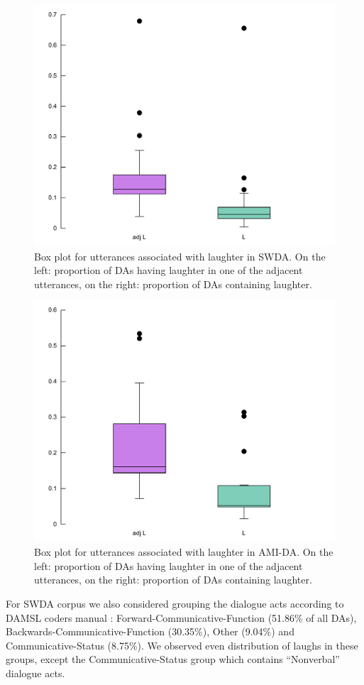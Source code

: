 \documentclass[11pt,a4paper]{article}
\begin{document}
\begin{figure}
  \centering
  \includegraphics[width=0.8\linewidth]{img/box-swda.pdf}
  \caption{Box plot for utterances associated with laughter in SWDA. On the left: proportion of DAs having laughter in one of the adjacent utterances, on the right: proportion of DAs containing laughter. }
    \label{fig:box-swda}
\end{figure}

\begin{figure}
  \centering
  \includegraphics[width=0.8\linewidth]{img/box-ami.pdf}
  \caption{Box plot for utterances associated with laughter in AMI-DA. On the left: proportion of DAs having laughter in one of the adjacent utterances, on the right: proportion of DAs containing laughter. }
    \label{fig:box-ami}
\end{figure}

For SWDA corpus we also considered grouping the dialogue acts according to DAMSL coders manual \citep{jurafskySwitchboardSWBDDAMSLShallowDiscourseFunction1997a}: Forward-Communicative-Function (51.86\% of all DAs), Backwards-Communicative-Function (30.35\%), Other (9.04\%) and Communicative-Status (8.75\%). We observed even distribution of laughs in these groups, except the Communicative-Status group which contains ``Nonverbal'' dialogue acts.
\end{document}
